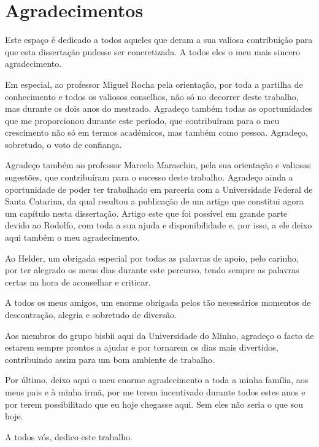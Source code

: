 
\chapter*{Agradecimentos}

Este espaço é dedicado a todos aqueles que deram a sua valiosa contribuição para que esta dissertação pudesse ser concretizada. A todos eles o meu mais sincero agradecimento.

Em especial, ao professor Miguel Rocha pela orientação, por toda a partilha de conhecimento e todos os valiosos conselhos, não só no decorrer deste trabalho, mas durante os dois anos do mestrado. Agradeço também todas as oportunidades que me proporcionou durante este período, que contribuíram para o meu crescimento não só em termos académicos, mas também como pessoa. Agradeço, sobretudo, o voto de confiança.

Agradeço também ao professor Marcelo Maraschin, pela sua orientação e valiosas sugestões, que contribuíram para o sucesso deste trabalho. Agradeço ainda a oportunidade de poder ter trabalhado em parceria com a Universidade Federal de Santa Catarina, da qual resultou a publicação de um artigo que constitui agora um capítulo nesta dissertação. Artigo este que foi possível em grande parte devido ao Rodolfo, com toda a sua ajuda e disponibilidade e, por isso, a ele deixo aqui também o meu agradecimento. 

Ao Helder, um obrigada especial por todas as palavras de apoio, pelo carinho, por ter alegrado os meus dias durante este percurso, tendo sempre as palavras certas na hora de aconselhar e criticar.

A todos os meus amigos, um enorme obrigada pelos tão necessários momentos de descontração, alegria e sobretudo de diversão.

Aos membros do grupo \gls{bisbii} aqui da Universidade do Minho, agradeço o facto de estarem sempre prontos a ajudar e por tornarem os dias mais divertidos, contribuindo assim para um bom ambiente de trabalho.

Por último, deixo aqui o meu enorme agradecimento a toda a minha família, aos meus pais e à minha irmã, por me terem incentivado durante todos estes anos e por terem possibilitado que eu hoje chegasse aqui. Sem eles não seria o que sou hoje. 

A todos vós, dedico este trabalho.
